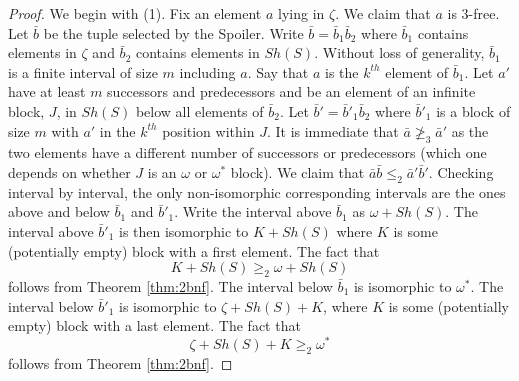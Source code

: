 \documentclass[11pt]{amsart}
\theoremstyle{definition}
\begin{document}
    \begin{proof}
    We begin with (1).
    Fix an element $a$ lying in $\zeta$.
    We claim that $a$ is $3$-free.
    Let $\bar{b}$ be the tuple selected by the Spoiler.
    Write $\bar{b}=\bar{b}_1\bar{b}_2$ where $\bar{b}_1$ contains elements in $\zeta$ and $\bar{b}_2$ contains elements in $Sh(S)$.
    Without loss of generality, $\bar{b}_1$ is a finite interval of size $m$ including $a$.
    Say that $a$ is the $k^{th}$ element of $\bar{b}_1$.
    Let $a'$ have at least $m$ successors and predecessors and be an element of an infinite block, $J$, in $Sh(S)$ below all elements of $\bar{b}_2$.
    Let $\bar{b}'=\bar{b}'_1\bar{b}_2$ where $\bar{b}'_1$ is a block of size $m$ with $a'$ in the $k^{th}$ position within $J$.
    It is immediate that $\bar{a}\not\geq_3\bar{a}'$ as the two elements have a different number of successors or predecessors (which one depends on whether $J$ is an $\omega$ or $\omega^*$ block). 
    We claim that $\bar{a}\bar{b}\leq_2\bar{a}'\bar{b}'$.
    Checking interval by interval, the only non-isomorphic corresponding intervals are the ones above and below $\bar{b}_1$ and $\bar{b}'_1$.
    Write the interval above $\bar{b}_1$ as $\omega+Sh(S)$.
    The interval above $\bar{b}'_1$ is then isomorphic to $K+Sh(S)$ where $K$ is some (potentially empty) block with a first element.
    The fact that
    \[K+Sh(S) \geq_2 \omega+Sh(S)\]
    follows from Theorem \ref{thm:2bnf}.
    The interval below $\bar{b}_1$ is isomorphic to $\omega^*$.
    The interval below $\bar{b}'_1$ is isomorphic to $\zeta+Sh(S)+K$, where $K$ is some (potentially empty) block with a last element.
    The fact that
    \[\zeta+Sh(S)+K \geq_2\omega^*\]
    follows from Theorem \ref{thm:2bnf}.


\end{proof}
\end{document}

